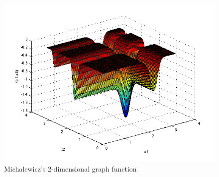 \documentclass{article}
\begin{document}
\begin{figure}[!h]
\includegraphics[width=\textwidth,height=\textheight,keepaspectratio]{michalewicz.png}
  \caption{Michalewicz's 2-dimensional graph function \cite{sf-uni-mc}}
\end{figure}
\vspace{0.5cm}

\end{document}
